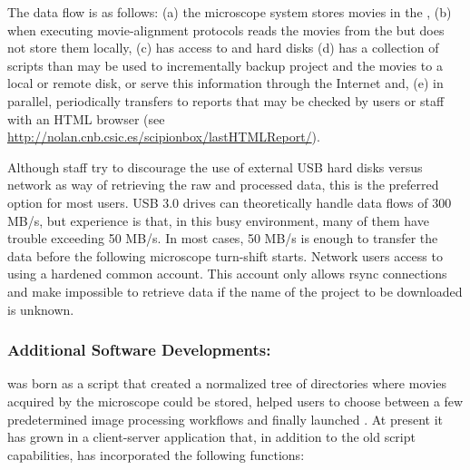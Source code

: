 The data flow is as follows: (a) the microscope system stores movies in the \mnas, (b) when executing movie-alignment protocols \scipionbox reads the movies from the \mnas but does not store them locally, (c) \onas has access to \mnas and \scipionbox hard disks (d) \onas has a collection of scripts than may be used to incrementally backup \scipion project and the movies to a local or remote disk, or serve this information through the Internet and, (e) in parallel, periodically \scipionbox transfers to  \hserver reports that may be checked by users or staff with an HTML browser (see \url{http://nolan.cnb.csic.es/scipionbox/lastHTMLReport/}).  

Although \cnb staff try to discourage the use of external USB hard disks versus network as way of retrieving the raw and processed data, this is the preferred option for most users.
USB 3.0 drives can theoretically handle data flows of 300 MB/s, but \cnb experience is that, in this busy environment, many of them  have trouble exceeding 50 MB/s. In most cases, 50 MB/s is enough to transfer the data before the following microscope  turn-shift starts. %
Network users access to \onas using a hardened common account. This account only allows rsync connections and make impossible to retrieve data if the name of the project to be downloaded is unknown. %

\subsubsection{Additional Software Developments: \emadmin}

\emadmin was born as a script that created a normalized tree of directories  
where movies acquired by the microscope could be stored, helped users to choose between a few predetermined image processing workflows and finally launched \scipion. At present it has grown in a client-server application that, in addition to the old script capabilities, has incorporated the following functions:

